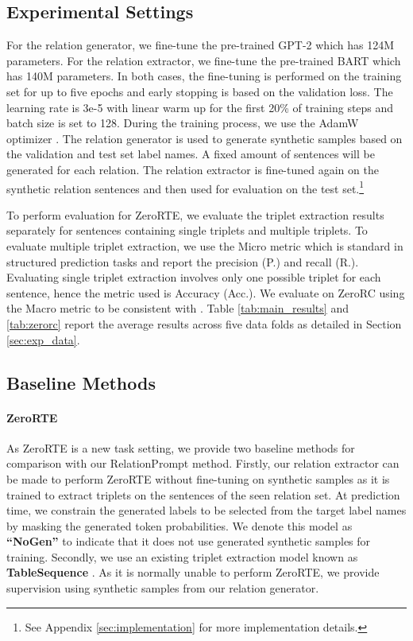 \documentclass[11pt]{article}
\begin{document}
 
\subsection{Experimental Settings}
For the relation generator, we fine-tune the pre-trained GPT-2 \cite{radford2019language} which has 124M parameters. 
For the relation extractor, we fine-tune the pre-trained BART \cite{lewis2020bart} which has 140M parameters.
In both cases, the fine-tuning is performed on the training set for up to five epochs and early stopping is based on the validation loss. 
The learning rate is 3e-5 with linear warm up for the first 20\% of training steps and batch size is set to 128.
During the training process, we use the AdamW optimizer \cite{loshchilov2018decoupled}.
The relation generator is used to generate synthetic samples based on the validation and test set label names. 
A fixed amount of sentences will be generated for each relation.
The relation extractor is fine-tuned again on the synthetic relation sentences and then used for evaluation on the test set.\footnote{See Appendix \ref{sec:implementation} for more implementation details.}

To perform evaluation for ZeroRTE, we evaluate the triplet extraction results separately for sentences containing single triplets and multiple triplets.
To evaluate multiple triplet extraction, we use the Micro  metric which is standard in structured prediction tasks \cite{paolini2020structured} and report the precision (P.) and recall (R.).
Evaluating single triplet extraction involves only one possible triplet for each sentence, hence the metric used is Accuracy (Acc.).
We evaluate on ZeroRC using the Macro  metric to be consistent with \citet{chen2021zs}.
Table \ref{tab:main_results} and \ref{tab:zerorc} report the average results across five data folds as detailed in Section \ref{sec:exp_data}.



\subsection{Baseline Methods}
\paragraph{ZeroRTE}
As ZeroRTE is a new task setting, we provide two baseline methods for comparison with our RelationPrompt method. 
Firstly, our relation extractor can be made to perform ZeroRTE without fine-tuning on synthetic samples as it is trained to extract triplets
on the sentences of the seen relation set.
At prediction time, we constrain the generated labels to be selected from the target label names by masking the generated token probabilities. 
We denote this model as 
\textbf{``NoGen''} 
to indicate that it does not use generated synthetic samples for training.
Secondly, we use an existing triplet extraction model known as \textbf{TableSequence} \cite{wang2020two}. 
As it is normally unable to perform ZeroRTE, we provide supervision using synthetic samples from our relation generator.
\end{document}
